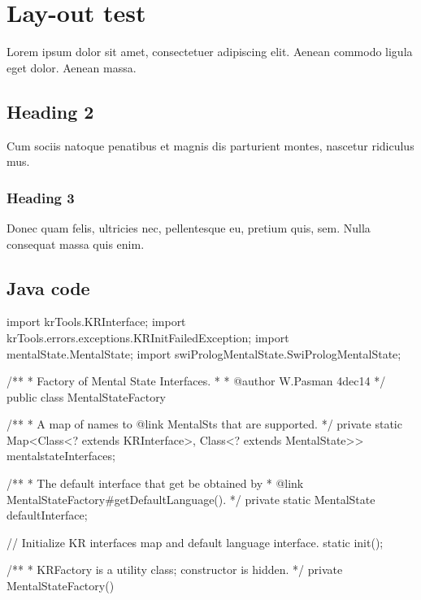 \section{Lay-out test}
Lorem ipsum dolor sit amet, consectetuer adipiscing elit. Aenean commodo ligula eget dolor. Aenean massa.

\subsection{Heading 2}
Cum sociis natoque penatibus et magnis dis parturient montes, nascetur ridiculus mus.

\subsubsection{Heading 3}
Donec quam felis, ultricies nec, pellentesque eu, pretium quis, sem. Nulla consequat massa quis enim.

\subsection{Java code}
\begin{javacode}
import krTools.KRInterface;
import krTools.errors.exceptions.KRInitFailedException;
import mentalState.MentalState;
import swiPrologMentalState.SwiPrologMentalState;

/**
 * Factory of Mental State Interfaces.
 *
 * @author W.Pasman 4dec14
 */
public class MentalStateFactory {

	/**
	 * A map of names to {@link MentalSt}s that are supported.
	 */
	private static Map<Class<? extends KRInterface>, Class<? extends MentalState>> mentalstateInterfaces;

	/**
	 * The default interface that get be obtained by
	 * {@link MentalStateFactory#getDefaultLanguage()}.
	 */
	private static MentalState defaultInterface;

	// Initialize KR interfaces map and default language interface.
	static {
		init();
	}

	/**
	 * KRFactory is a utility class; constructor is hidden.
	 */
	private MentalStateFactory() {
	}
}
\end{javacode}